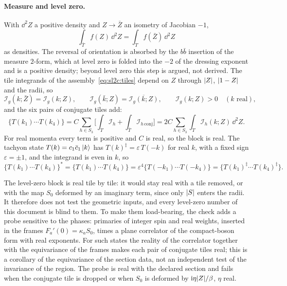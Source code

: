 \paragraph{Measure and level zero.}
With $\dd^2 Z$ a positive density and $Z \to \bar Z$ an isometry of Jacobian $- 1$,
\begin{equation}
  \int_{\bar T} f(Z) \, \dd^2 Z
    = \int_T f(\bar Z) \, \dd^2 Z
\end{equation}
as densities.
The reversal of orientation is absorbed by the $b \bar b$ insertion of the measure $2$-form, which at level zero is folded into the $- 2$ of the dressing exponent and is a positive density; beyond level zero this step is argued, not derived.
The tile integrands of the assembly~\eqref{eq:sl2c:tiles} depend on $Z$ through ${|Z|}$, ${|1 - Z|}$ and the radii, so
\begin{equation}
  \mathcal I_g(k; \bar Z)
    = \mathcal I_g(k; Z),
  \qquad
  \mathcal I_g(\bar k; Z)
    = \overline{\mathcal I_g(k; Z)},
  \qquad
  \mathcal I_g(k; Z)
    > 0
  \quad
  (k \text{ real}),
\end{equation}
and the six pairs of conjugate tiles add:
\begin{equation}
  \{ T(k_1) \cdots T(k_4) \}
    = C \sum_{h \in S_3} \Big[ \int_T \mathcal I_h + \int_{\bar T} \mathcal I_{h \, \mathrm{conj}} \Big]
    = 2 C \sum_{h \in S_3} \int_T \mathcal I_h(k; Z) \, \dd^2 Z.
\end{equation}
For real momenta every term is positive and $C$ is real, so the block is real.
The tachyon state $T(k) = c_1 \bar c_1 \ket{k}$ has $T(k)^\ddagger = \varepsilon \, T(-k)$ for real $k$, with a fixed sign $\varepsilon = \pm 1$, and the integrand is even in $k$, so
\begin{equation}
  \{ T(k_1) \cdots T(k_4) \}^*
    = \{ T(k_1) \cdots T(k_4) \}
    = \varepsilon^4 \{ T(- k_1) \cdots T(- k_4) \}
    = \{ T(k_1)^\ddagger \cdots T(k_4)^\ddagger \}.
\end{equation}

The level-zero block is real tile by tile: it would stay real with a tile removed, or with the map $S_0$ deformed by an imaginary term, since only ${|S|}$ enters the radii.
It therefore does not test the geometric inputs, and every level-zero number of this document is blind to them.
To make them load-bearing, the check adds a probe sensitive to the phases: primaries of integer spin and real weights, inserted in the frames $F_a'(0) = \kappa_a S_0$, times a plane correlator of the compact-boson form with real exponents.
For such states the reality of the correlator together with the equivariance of the frames makes each pair of conjugate tiles real; this is a corollary of the equivariance of the section data, not an independent test of the invariance of the region.
The probe is real with the declared section and fails when the conjugate tile is dropped or when $S_0$ is deformed by $\mathrm{i} \eta {|Z|} / \beta$, $\eta$ real.


